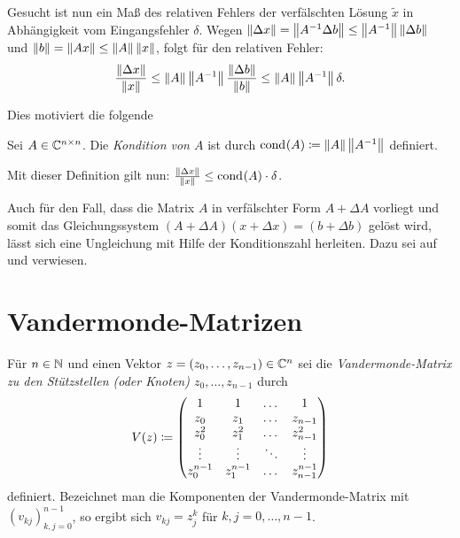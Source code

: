 \noindent Gesucht ist nun ein Maß des relativen Fehlers der verfälschten Lösung
$\tilde{x}$ in Abhängigkeit vom Eingangsfehler $\delta$.
Wegen $ \left\lVert \Delta x \right\rVert = \left\lVert A^{-1} \Delta b \right\rVert \leq \left\lVert A^{-1} \right\rVert \left\lVert \Delta b \right\rVert $
und $ \left\lVert b \right\rVert = \left\lVert A x \right\rVert \leq \left\lVert A \right\rVert \left\lVert x \right\rVert $,
folgt für den relativen Fehler:
\[
    \frac{\left\lVert \Delta x \right\rVert}{\left\lVert x \right\rVert}
    \leq \left\lVert A \right\rVert \left\lVert A^{-1} \right\rVert \frac{\left\lVert \Delta b \right\rVert}{\left\lVert b \right\rVert}
    \leq \left\lVert A \right\rVert \left\lVert A^{-1} \right\rVert \delta.
\]

\noindent Dies motiviert die folgende
\begin{mydef}
    Sei $A \in \mathbb{C}^{n \times n}$.
    Die \emph{Kondition von $A$} ist durch
    $\text{cond}_{{}}\! \left( A \right) \coloneqq \left\lVert A \right\rVert \left\lVert A^{-1} \right\rVert$
    definiert.
\end{mydef}

\begin{remark}
    Mit dieser Definition gilt nun: $ \frac{\left\lVert \Delta x \right\rVert}{\left\lVert x \right\rVert} \leq \text{cond}_{{}}\! \left( A \right) \cdot \delta $.
\end{remark}

\begin{remark}
    Auch für den Fall, dass die Matrix $A$ in verfälschter Form $A + \Delta A$
    vorliegt und somit das Gleichungssystem $(A + \Delta A)(x + \Delta x) = (b
    + \Delta b)$ gelöst wird, lässt sich eine Ungleichung mit Hilfe der
    Konditionszahl herleiten. Dazu sei auf \cite[S. 203ff]{stoer1} und \cite[S.
    54ff]{schaback} verwiesen.
\end{remark}

\section{Vandermonde-Matrizen}

\begin{mydef}
    Für $n \in \mathbb{N}$ und einen Vektor ${z = (z_0, \dots, z_{n-1}) \in \mathbb{C}^n}$
    sei die
    \emph{Vandermonde-Matrix zu den Stützstellen (oder Knoten) $z_0, \dots, z_{n-1}$}
    durch
    \[
        V \! \left( z \right) \coloneqq \begin{pmatrix}
            1         & 1         & \dots & 1 \\
            z_0       & z_1       & \dots & z_{n-1} \\
            z_0^2     & z_1^2     & \dots & z_{n-1}^2 \\
            \vdots    & \vdots    & \ddots & \vdots \\
            z_0^{n-1} & z_1^{n-1} & \dots & z_{n-1}^{n-1}
        \end{pmatrix}
    \]
    definiert.
    Bezeichnet man die Komponenten der Vandermonde-Matrix mit
    $\left( v_{kj} \right)_{k,j = 0}^{n-1}$, so ergibt sich
    $ v_{kj} = z_j^k $ für $k, j = 0, \dots, n-1$.

\end{mydef}

